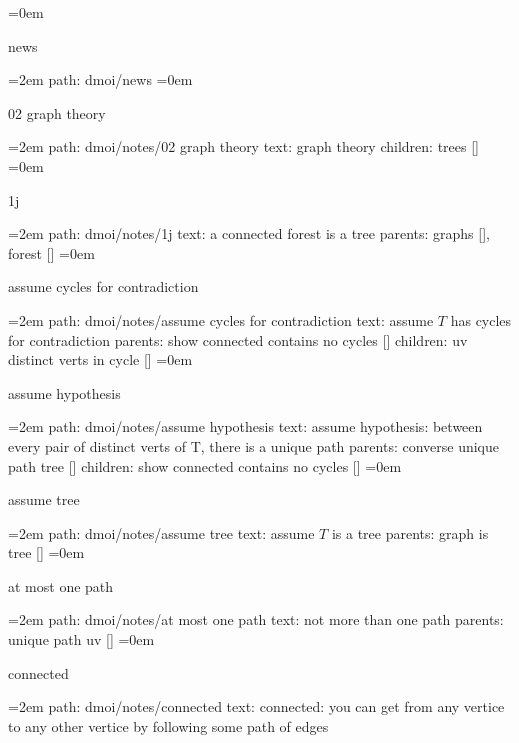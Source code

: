 \smallskip
\leftskip=0em
\par\endgroup
\bigskip
{}
news
\smallskip
\par\begingroup
\leftskip=2em
path: dmoi/news
\smallskip
\leftskip=0em
\par\endgroup
\bigskip
{}
02 graph theory
\smallskip
\par\begingroup
\leftskip=2em
path: dmoi/notes/02 graph theory
\smallskip
text:  graph theory
\smallskip
children: trees []
\smallskip
\leftskip=0em
\par\endgroup
\bigskip
{}
1j
\smallskip
\par\begingroup
\leftskip=2em
path: dmoi/notes/1j
\smallskip
text:  a connected forest is a tree
\smallskip
parents:  graphs [], forest []
\smallskip
\leftskip=0em
\par\endgroup
\bigskip
{}
assume cycles for contradiction
\smallskip
\par\begingroup
\leftskip=2em
path: dmoi/notes/assume cycles for contradiction
\smallskip
text:  assume $T$ has cycles for contradiction
\smallskip
parents:  show connected contains no cycles []
\smallskip
children: uv distinct verts in cycle []
\smallskip
\leftskip=0em
\par\endgroup
\bigskip
{}
assume hypothesis
\smallskip
\par\begingroup
\leftskip=2em
path: dmoi/notes/assume hypothesis
\smallskip
text:  assume hypothesis: between every pair of distinct verts of T, there is a unique path
\smallskip
parents:  converse unique path tree []
\smallskip
children: show connected contains no cycles []
\smallskip
\leftskip=0em
\par\endgroup
\bigskip
{}
assume tree
\smallskip
\par\begingroup
\leftskip=2em
path: dmoi/notes/assume tree
\smallskip
text:  assume $T$ is a tree
\smallskip
parents:  graph is tree []
\smallskip
\leftskip=0em
\par\endgroup
\bigskip
{}
at most one path
\smallskip
\par\begingroup
\leftskip=2em
path: dmoi/notes/at most one path
\smallskip
text:  not more than one path
\smallskip
parents:  unique path uv []
\smallskip
\leftskip=0em
\par\endgroup
\bigskip
{}
connected
\smallskip
\par\begingroup
\leftskip=2em
path: dmoi/notes/connected
\smallskip
text:  connected: you can get from any vertice to any other vertice by following some path of edges
